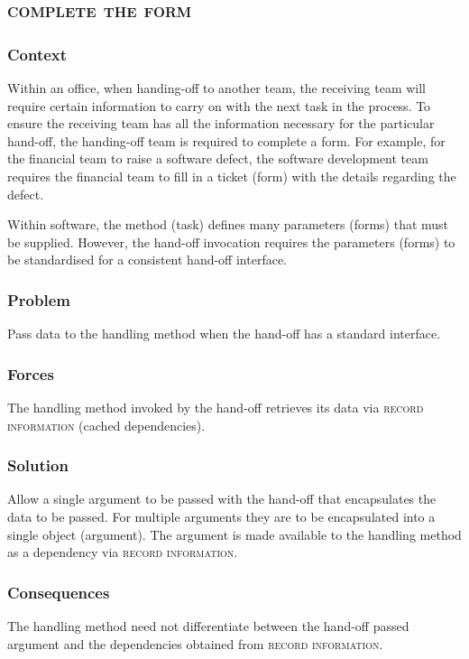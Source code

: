 \documentclass[prodmode]{style/acmlarge}
\begin{document}
\subsection{\textsc{\textbf{complete the form}}}

\subsubsection*{Context} Within an office, when handing-off to another team, the
receiving team will require certain information to carry on with the next task
in the process.  To ensure the receiving team has all the information necessary
for the particular hand-off, the handing-off team is required to complete a
form.  For example, for the financial team to raise a software defect, the
software development team requires the financial team to fill in a ticket (form)
with the details regarding the defect.

Within software, the method (task) defines many parameters (forms) that must be
supplied.  However, the hand-off invocation requires the parameters (forms) to
be standardised for a consistent hand-off interface.

\subsubsection*{\textbf{Problem}} Pass data to the handling method when the hand-off has
a standard interface.

\subsubsection*{Forces} The handling method invoked by the hand-off retrieves
its data via \textsc{record information} (cached dependencies).

\subsubsection*{\textbf{Solution}} Allow a single argument to be passed with the
hand-off that encapsulates the data to be passed.  For multiple arguments they
are to be encapsulated into a single object (argument).  The argument is made
available to the handling method as a dependency via \textsc{record
information}.

\subsubsection*{Consequences} The handling method need not differentiate between
the hand-off passed argument and the dependencies obtained from \textsc{record
information}.
\end{document}
